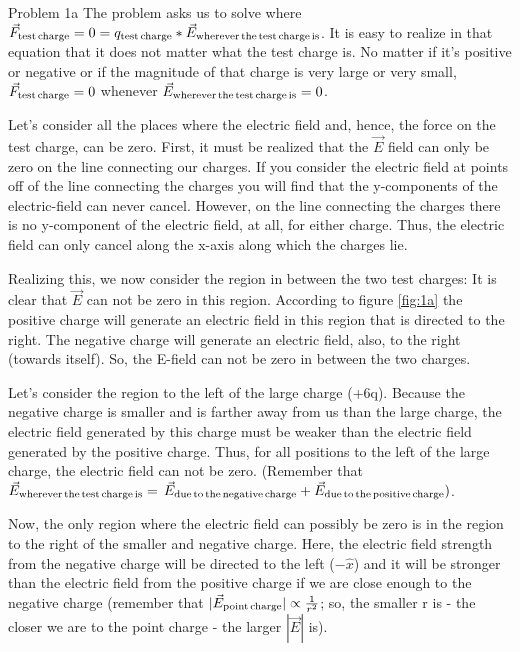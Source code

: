 \begin{homeworkProblem}
\begin{homeworkSection}{Problem 1a}
The problem asks us to solve where $\vec{F}_{\text{test\,charge}} = 0 = q_{\text{test\,charge}}*\vec{E}_{\text{wherever\,the\,test\,charge\,is}}$. It is easy to realize in that equation that it does not matter what the test charge is. No matter if it's positive or negative or if the magnitude of that charge is very large or very small, $\vec{F}_{\text{test\,charge}}=0$ whenever $\vec{E}_{\text{wherever\,the\,test\,charge\,is}} = 0$.


Let's consider all the places where the electric field and, hence, the force on the test charge, can be zero. First, it must be realized that the $\vec{E}$ field can only be zero on the line connecting our charges. If you consider the electric field at points off of the line connecting the charges you will find that the y-components of the electric-field can never cancel. However, on the line connecting the charges there is no y-component of the electric field, at all, for either charge. Thus, the electric field can only cancel along the x-axis along which the charges lie.


Realizing this, we now consider the region in between the two test charges: It
is clear that $\vec{E}$ can not be zero in this region. According to figure
\ref{fig:1a} the positive charge will generate an electric field in this region
that is directed to the right. The negative charge will generate an electric
field, also, to the right (towards itself). So, the E-field can not be zero in
between the two charges.


Let's consider the region to the left of the large charge (+6q). Because the negative charge is smaller and is farther away from us than the large charge, the electric field generated by this charge must be weaker than the electric field generated by the positive charge. Thus, for all positions to the left of the large charge, the electric field can not be zero. (Remember that $\vec{E}_{\text{wherever\,the\,test\,charge\,is}} =$ \newline $\vec{E}_{\text{due\,to\,the\,negative\,charge}}+ \vec{E}_{\text{due\,to\,the\,positive\,charge}})$.


Now, the only region where the electric field can possibly be zero is in the region to the right of the smaller and negative charge. Here, the electric field strength from the negative charge will be directed to the left ($-\hat{x}$) and it will be stronger than the electric field from the positive charge if we are close enough to the negative charge (remember that $|\vec{E}_{\text{point\,charge}}|\propto \frac{1}{r^2}$; so, the smaller r is - the closer we are to the point charge - the larger $|\vec{E}|$ is).


\end{homeworkSection}
\end{homeworkProblem}
